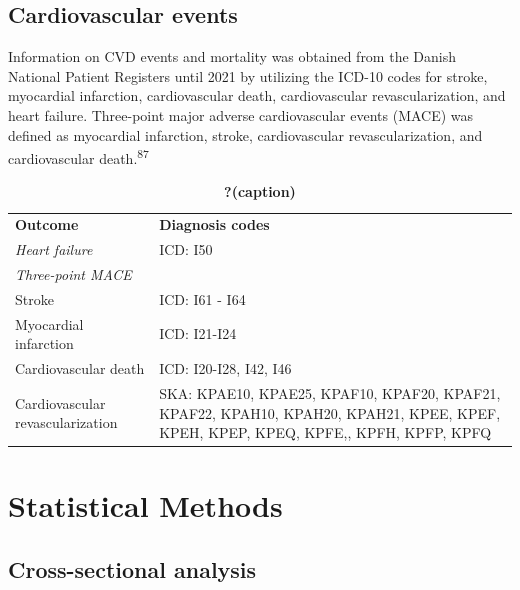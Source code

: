 \documentclass[
  a4paper,
  headsepline=true,
  open=left]{scrbook}
\begin{document}
\hypertarget{cardiovascular-events}{%
\subsection{Cardiovascular events}\label{cardiovascular-events}}

Information on CVD events and mortality was obtained from the Danish
National Patient Registers until 2021 by utilizing the ICD-10 codes for
stroke, myocardial infarction, cardiovascular death, cardiovascular
revascularization, and heart failure. Three-point major adverse
cardiovascular events (MACE) was defined as myocardial infarction,
stroke, cardiovascular revascularization, and cardiovascular
death.\textsuperscript{87}

\begin{table}

\caption{\label{tbl-mace}\textbf{?(caption)}}\begin{minipage}[t]{\linewidth}

{\centering 

\begin{tabular}[t]{ll}
\toprule
\textbf{Outcome} & \textbf{Diagnosis codes}\\
\emph{Heart failure} & ICD: I50\\
\emph{Three-point MACE} & \\
Stroke & ICD: I61 - I64\\
Myocardial infarction & ICD: I21-I24\\
Cardiovascular death & ICD: I20-I28, I42, I46\\
Cardiovascular revascularization & SKA: KPAE10, KPAE25, KPAF10, KPAF20,
KPAF21, KPAF22, KPAH10, KPAH20, KPAH21, KPEE, KPEF, KPEH, KPEP, KPEQ,
KPFE,, KPFH, KPFP, KPFQ\\
\bottomrule
\end{tabular}

}

\end{minipage}%

\end{table}

\hypertarget{statistical-methods}{%
\section{Statistical Methods}\label{statistical-methods}}

\hypertarget{cross-sectional-analysis}{%
\subsection{Cross-sectional analysis}\label{cross-sectional-analysis}}
\end{document}
